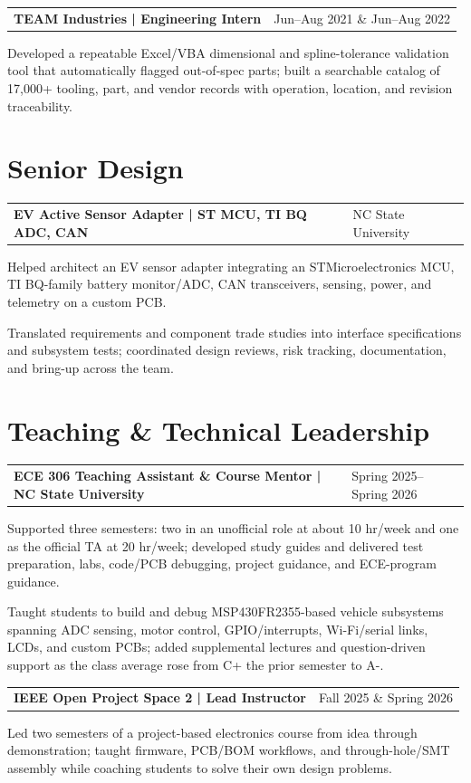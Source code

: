 \documentclass[10pt,letterpaper]{article}
\makeatletter
\newcommand{\resumeentry}[2]{%
  \begin{tabularx}{\textwidth}{@{}X>{\raggedleft\arraybackslash}p{2.40in}@{}}
    \textbf{#1} & #2
  \end{tabularx}\vspace{-0.075cm}
}
\makeatother
\begin{document}
\resumeentry{TEAM Industries | Engineering Intern}{Jun--Aug 2021 \& Jun--Aug 2022}
\begin{resumebullets}
  \item Developed a repeatable Excel/VBA dimensional and spline-tolerance validation tool that automatically flagged out-of-spec parts; built a searchable catalog of 17,000+ tooling, part, and vendor records with operation, location, and revision traceability.
\end{resumebullets}

\section{Senior Design}
\resumeentry{EV Active Sensor Adapter | ST MCU, TI BQ ADC, CAN}{NC State University}
\begin{resumebullets}
  \item Helped architect an EV sensor adapter integrating an STMicroelectronics MCU, TI BQ-family battery monitor/ADC, CAN transceivers, sensing, power, and telemetry on a custom PCB.
  \item Translated requirements and component trade studies into interface specifications and subsystem tests; coordinated design reviews, risk tracking, documentation, and bring-up across the team.
\end{resumebullets}

\section{Teaching \& Technical Leadership}
\resumeentry{ECE 306 Teaching Assistant \& Course Mentor | NC State University}{Spring 2025--Spring 2026}
\begin{resumebullets}
  \item Supported three semesters: two in an unofficial role at about 10 hr/week and one as the official TA at 20 hr/week; developed study guides and delivered test preparation, labs, code/PCB debugging, project guidance, and ECE-program guidance.
  \item Taught students to build and debug MSP430FR2355-based vehicle subsystems spanning ADC sensing, motor control, GPIO/interrupts, Wi-Fi/serial links, LCDs, and custom PCBs; added supplemental lectures and question-driven support as the class average rose from C+ the prior semester to A-.
\end{resumebullets}

\resumeentry{IEEE Open Project Space 2 | Lead Instructor}{Fall 2025 \& Spring 2026}
\begin{resumebullets}
  \item Led two semesters of a project-based electronics course from idea through demonstration; taught firmware, PCB/BOM workflows, and through-hole/SMT assembly while coaching students to solve their own design problems.
\end{resumebullets}
\end{document}
